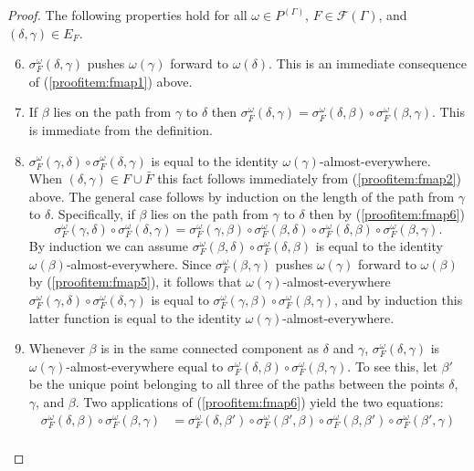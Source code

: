 \documentclass[10pt,a4paper]{amsart}
\def\cal{\mathcal}
\begin{document}
\begin{proof}
	The following properties hold for all $\omega \in P^{(\Gamma)}$, $F \in \cal F(\Gamma)$, and $(\delta, \gamma) \in E_F$.
	\begin{enumerate}\setcounter{enumi}{5}
		\item \label{proofitem:fmap5} $\sigma_F^\omega(\delta, \gamma)$ pushes $\omega(\gamma)$ forward to $\omega(\delta)$. This is an immediate consequence of (\ref{proofitem:fmap1}) above.
		\item \label{proofitem:fmap6} If $\beta$ lies on the path from $\gamma$ to $\delta$ then $\sigma_F^\omega(\delta, \gamma) = \sigma_F^\omega(\delta, \beta) \circ \sigma_F^\omega(\beta, \gamma)$. This is immediate from the definition.
		\item \label{proofitem:fmap7} $\sigma_F^\omega(\gamma, \delta) \circ \sigma_F^\omega(\delta, \gamma)$ is equal to the identity $\omega(\gamma)$-almost-everywhere. When $(\delta, \gamma) \in F \cup \bar F$ this fact follows immediately from (\ref{proofitem:fmap2}) above. The general case follows by induction on the length of the path from $\gamma$ to $\delta$. Specifically, if $\beta$ lies on the path from $\gamma$ to $\delta$ then by (\ref{proofitem:fmap6})
		\[\sigma_F^\omega(\gamma, \delta) \circ \sigma_F^\omega(\delta, \gamma) = \sigma_F^\omega(\gamma, \beta) \circ \sigma_F^\omega(\beta, \delta) \circ \sigma_F^\omega(\delta, \beta) \circ \sigma_F^\omega(\beta, \gamma).\]
		By induction we can assume $\sigma_F^\omega(\beta, \delta) \circ \sigma_F^\omega(\delta, \beta)$ is equal to the identity $\omega(\beta)$-almost-everywhere. Since $\sigma_F^\omega(\beta, \gamma)$ pushes $\omega(\gamma)$ forward to $\omega(\beta)$ by (\ref{proofitem:fmap5}), it follows that $\omega(\gamma)$-almost-everywhere $\sigma_F^\omega(\gamma, \delta) \circ \sigma_F^\omega(\delta, \gamma)$ is equal to $\sigma_F^\omega(\gamma, \beta) \circ \sigma_F^\omega(\beta, \gamma)$, and by induction this latter function is equal to the identity $\omega(\gamma)$-almost-everywhere.
		\item \label{proofitem:fmap8} Whenever $\beta$ is in the same connected component as $\delta$ and $\gamma$, $\sigma_F^\omega(\delta, \gamma)$ is $\omega(\gamma)$-almost-everywhere equal to $\sigma_F^\omega(\delta, \beta) \circ \sigma_F^\omega(\beta, \gamma)$. To see this, let $\beta'$ be the unique point belonging to all three of the paths between the points $\delta$, $\gamma$, and $\beta$. Two applications of (\ref{proofitem:fmap6}) yield the two equations:
		\begin{align*}
			\sigma_F^\omega(\delta, \beta) \circ \sigma_F^\omega(\beta, \gamma) & = \sigma_F^\omega(\delta, \beta') \circ \sigma_F^\omega(\beta', \beta) \circ \sigma_F^\omega(\beta, \beta') \circ \sigma_F^\omega(\beta', \gamma)\\

\end{align*}
\end{enumerate}
\end{proof}
\end{document}
